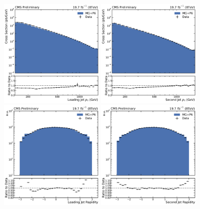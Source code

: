 \begin{figure}[htbp]
    \centering
    \includegraphics[width=0.45\textwidth]{figures/measurement/jet1pt_default.pdf}\hfill
    \includegraphics[width=0.45\textwidth]{figures/measurement/jet2pt_default.pdf}
    \includegraphics[width=0.45\textwidth]{figures/measurement/jet1rap_default.pdf}\hfill
    \includegraphics[width=0.45\textwidth]{figures/measurement/jet2rap_default.pdf}

\end{figure}
